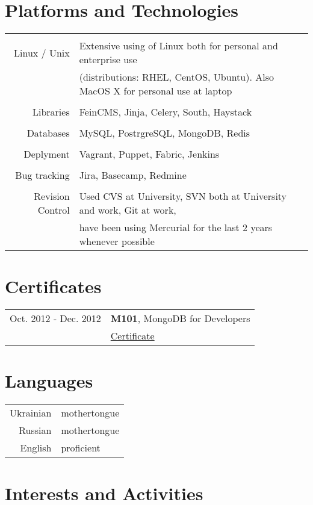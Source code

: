 \documentclass[a4paper,10pt]{article}
\begin{document}
\section{Platforms and Technologies}
 \begin{tabular}{r|p{11cm}}
 \multicolumn{2}{c}{} \\
  Linux / Unix & Extensive using of Linux both for personal and enterprise use \\
  & (distributions: RHEL, CentOS, Ubuntu). Also MacOS X for personal use at laptop \\
 \multicolumn{2}{c}{} \\
  Libraries & FeinCMS, Jinja, Celery, South, Haystack \\
 \multicolumn{2}{c}{} \\
  Databases & MySQL, PostrgreSQL, MongoDB, Redis \\
 \multicolumn{2}{c}{} \\
  Deplyment & Vagrant, Puppet, Fabric, Jenkins \\
 \multicolumn{2}{c}{} \\
  Bug tracking & Jira, Basecamp, Redmine \\
 \multicolumn{2}{c}{} \\
  Revision Control & Used CVS at University, SVN both at University and work,  Git at work, \\
  & have been using Mercurial for the last 2 years whenever possible \\
 \end{tabular}

 \section{Certificates}
 \begin{tabular}{rl}
  Oct. 2012 - Dec. 2012 & \textbf{M101}, MongoDB for Developers\\
  & \href{https://s3.amazonaws.com/edu-cert.10gen.com/downloads/8381fb4e8cff46cc82353a3ecea5a070/Certificate.pdf}{Certificate} \\	
 \end{tabular}

 \section{Languages}
 \begin{tabular}{rl}
  Ukrainian & mothertongue \\
  Russian & mothertongue \\
  English & proficient \\
 \end{tabular}

\section{Interests and Activities}
\end{document}
